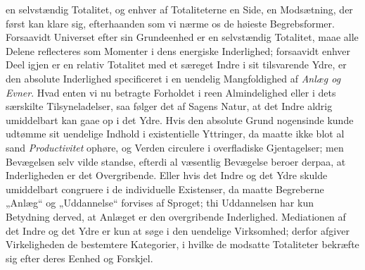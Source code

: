 \documentclass[12pt]{book}
\begin{document}
en selvstændig Totalitet, og enhver af Totaliteterne en Side, en Modsætning, der først kan klare
sig, efterhaanden som vi nærme os de høieste Begrebsformer. Forsaavidt Universet efter sin
Grundeenhed er en selvstændig Totalitet, maae alle Delene reflecteres som Momenter i dens
energiske Inderlighed; forsaavidt enhver Deel igjen er en relativ Totalitet med et særeget Indre
i sit tilsvarende Ydre, er den absolute Inderlighed specificeret i en uendelig Mangfoldighed af
\emph{Anlæg og Evner}. Hvad enten vi nu betragte Forholdet i reen Almindelighed eller i dets
særskilte Tilsyneladelser, saa følger det af Sagens Natur, at det Indre aldrig umiddelbart kan
gaae op i det Ydre. Hvis den absolute Grund nogensinde kunde udtømme sit uendelige Indhold i
existentielle Yttringer, da maatte ikke blot al sand \emph{Productivitet} ophøre, og Verden
circulere i overfladiske Gjentagelser; men Bevægelsen selv vilde standse, efterdi al væsentlig
Bevægelse beroer derpaa, at Inderligheden er det Overgribende. Eller hvis det Indre og det Ydre
skulde umiddelbart congruere i de individuelle Existenser, da maatte Begreberne „Anlæg“ og
„Uddannelse“ forvises af Sproget; thi Uddannelsen har kun Betydning derved, at Anlæget er den
overgribende Inderlighed. Mediationen af det Indre og det Ydre er kun at søge i den uendelige
Virksomhed; derfor afgiver Virkeligheden de bestemtere Kategorier, i hvilke de modsatte
Totaliteter bekræfte sig efter deres Eenhed og Forskjel.
\end{document}

